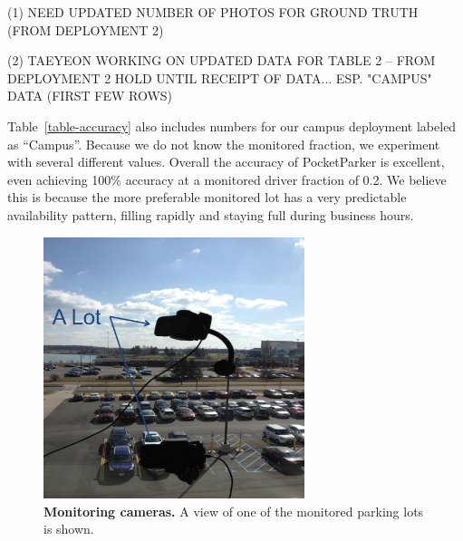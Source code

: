 (1)  NEED UPDATED NUMBER OF PHOTOS FOR GROUND TRUTH (FROM DEPLOYMENT 2)

(2)  TAEYEON WORKING ON UPDATED DATA FOR TABLE 2 -- FROM DEPLOYMENT 2
HOLD UNTIL RECEIPT OF DATA...  ESP. "CAMPUS" DATA (FIRST FEW ROWS)

Table~\ref{table-accuracy} also includes numbers for our campus deployment
labeled as ``Campus''. Because we do not know the monitored fraction, we
experiment with several different values. Overall the accuracy of
PocketParker is excellent, even achieving 100\% accuracy at a monitored
driver fraction of 0.2. We believe this is because the more preferable
monitored lot has a very predictable availability pattern, filling rapidly
and staying full during business hours.


\begin{figure}[t]
\centering
\includegraphics[width=3.0in]{./figures/Camera_setting.pdf}

\caption{\textbf{Monitoring cameras.} A view of one of the monitored parking
lots is shown.}

\label{fig-camera}
\end{figure}
